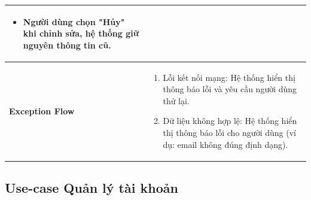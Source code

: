 \begin{longtable}[H]{|l|p{}|}
\begin{itemize}[leftmargin=4mm]
        \item Người dùng chọn "Hủy" khi chỉnh sửa, hệ thống giữ nguyên thông tin cũ.
    \end{itemize} \\
    \hline
    \textbf{Exception Flow} & 
    \begin{enumerate}[leftmargin=5.5mm]
        \item Lỗi kết nối mạng: Hệ thống hiển thị thông báo lỗi và yêu cầu người dùng thử lại.
        \item Dữ liệu không hợp lệ: Hệ thống hiển thị thông báo lỗi cho người dùng (ví dụ: email không đúng định dạng).
    \end{enumerate} \\
    \hline
\end{longtable}

\subsection{Use-case Quản lý tài khoản}
